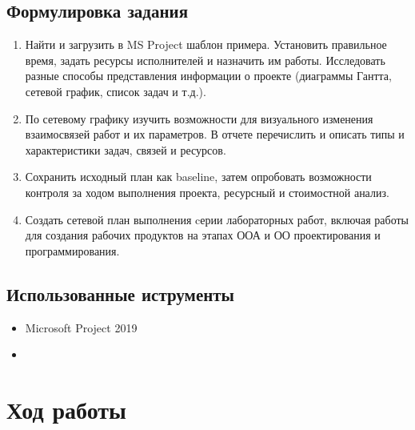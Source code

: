 \documentclass[a4paper, 14pt]{extarticle}
\begin{document}
\subsection{Формулировка задания}
\begin{enumerate}
    \item Найти и загрузить в MS Project шаблон примера. Установить правильное время, задать ресурсы исполнителей и назначить им работы. Исследовать разные способы представления информации о проекте (диаграммы Гантта, сетевой график, список задач и т.д.).
    \item По сетевому графику изучить возможности для визуального изменения взаимосвязей работ и их параметров. В отчете перечислить и описать типы и характеристики задач, связей и ресурсов.
    \item Сохранить исходный план как baseline, затем опробовать возможности контроля за ходом выполнения проекта, ресурсный и стоимостной анализ.
    \item Создать сетевой план выполнения cерии лабораторных работ, включая работы для создания рабочих продуктов на этапах ООА и ОО проектирования и программирования.
\end{enumerate}

\subsection{Использованные иструменты}
\begin{itemize}
    \item Microsoft Project 2019
    \item \XeLaTeX{}
\end{itemize}

\section{Ход работы}
\end{document}
